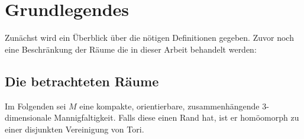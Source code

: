 \section{Grundlegendes}
\label{sec:defs}
    Zunächst wird ein Überblick über die nötigen Definitionen gegeben. Zuvor noch eine Beschränkung der Räume die in dieser Arbeit behandelt werden:


    \subsection{Die betrachteten Räume}
        Im Folgenden sei $M$ eine kompakte, orientierbare, zusammenhängende $3$-dimensionale Mannigfaltigkeit. Falls diese einen Rand hat, ist er homöomorph zu einer disjunkten Vereinigung von Tori.



